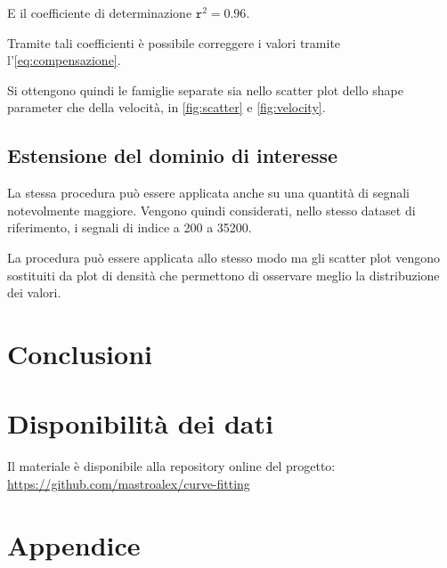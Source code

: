 E il coefficiente di determinazione $\mathtt{r}^2=0.96$. 

Tramite tali coefficienti è possibile correggere i valori tramite l'\cref{eq:compensazione}.

Si ottengono quindi le famiglie separate sia nello scatter plot dello shape parameter che della velocità, in \cref{fig:scatter} e \cref{fig:velocity}.


\subsection{Estensione del dominio di interesse}

La stessa procedura può essere applicata anche su una quantità di segnali notevolmente maggiore. Vengono quindi considerati, nello stesso dataset di riferimento, i segnali di indice a 200 a 35200. 

La procedura può essere applicata allo stesso modo ma gli scatter plot vengono sostituiti da plot di densità che permettono di osservare meglio la distribuzione dei valori.


\section{Conclusioni}


\section*{Disponibilità dei dati}

Il materiale è disponibile alla repository online del progetto: \url{https://github.com/mastroalex/curve-fitting}


\raggedbottom
\printbibliography[title=Riferimenti]


\clearpage
\onecolumn
\section*{Appendice}




